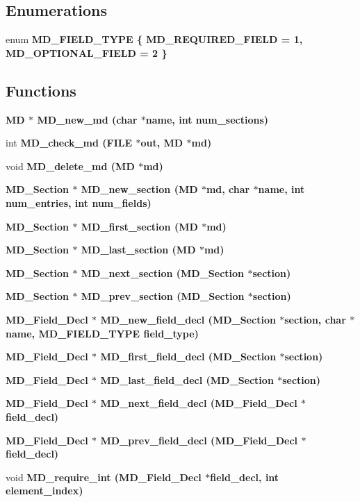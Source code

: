 \subsection*{Enumerations}
\begin{CompactItemize}
\item 
enum \bf{MD\_\-FIELD\_\-TYPE} \{ \bf{MD\_\-REQUIRED\_\-FIELD} =  1, 
\bf{MD\_\-OPTIONAL\_\-FIELD} =  2
 \}
\end{CompactItemize}
\subsection*{Functions}
\begin{CompactItemize}
\item 
\bf{MD} $\ast$ \bf{MD\_\-new\_\-md} (char $\ast$\bf{name}, int num\_\-sections)
\item 
int \bf{MD\_\-check\_\-md} (FILE $\ast$out, \bf{MD} $\ast$md)
\item 
void \bf{MD\_\-delete\_\-md} (\bf{MD} $\ast$md)
\item 
\bf{MD\_\-Section} $\ast$ \bf{MD\_\-new\_\-section} (\bf{MD} $\ast$md, char $\ast$\bf{name}, int num\_\-entries, int num\_\-fields)
\item 
\bf{MD\_\-Section} $\ast$ \bf{MD\_\-first\_\-section} (\bf{MD} $\ast$md)
\item 
\bf{MD\_\-Section} $\ast$ \bf{MD\_\-last\_\-section} (\bf{MD} $\ast$md)
\item 
\bf{MD\_\-Section} $\ast$ \bf{MD\_\-next\_\-section} (\bf{MD\_\-Section} $\ast$section)
\item 
\bf{MD\_\-Section} $\ast$ \bf{MD\_\-prev\_\-section} (\bf{MD\_\-Section} $\ast$section)
\item 
\bf{MD\_\-Field\_\-Decl} $\ast$ \bf{MD\_\-new\_\-field\_\-decl} (\bf{MD\_\-Section} $\ast$section, char $\ast$\bf{name}, \bf{MD\_\-FIELD\_\-TYPE} field\_\-type)
\item 
\bf{MD\_\-Field\_\-Decl} $\ast$ \bf{MD\_\-first\_\-field\_\-decl} (\bf{MD\_\-Section} $\ast$section)
\item 
\bf{MD\_\-Field\_\-Decl} $\ast$ \bf{MD\_\-last\_\-field\_\-decl} (\bf{MD\_\-Section} $\ast$section)
\item 
\bf{MD\_\-Field\_\-Decl} $\ast$ \bf{MD\_\-next\_\-field\_\-decl} (\bf{MD\_\-Field\_\-Decl} $\ast$field\_\-decl)
\item 
\bf{MD\_\-Field\_\-Decl} $\ast$ \bf{MD\_\-prev\_\-field\_\-decl} (\bf{MD\_\-Field\_\-Decl} $\ast$field\_\-decl)
\item 
void \bf{MD\_\-require\_\-int} (\bf{MD\_\-Field\_\-Decl} $\ast$field\_\-decl, int element\_\-index)

\end{CompactItemize}
